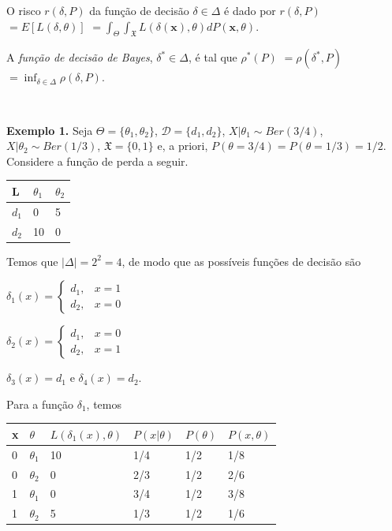 \documentclass[
]{book}
\begin{document}
O risco \(r(\delta,P)\) da função de decisão \(\delta \in \Delta\) é dado por \(r(\delta,P)\) \(=E\left[L\left(\delta,\theta\right)\right]\) \(=\displaystyle \int_\Theta \int_{\mathfrak{X}} L\left(\delta(\boldsymbol x),\theta\right) dP(\boldsymbol x,\theta)\).

A \emph{função de decisão de Bayes}, \({\delta}^* \in \Delta\), é tal que \({\rho}^*(P)\) \(=\rho({\delta}^*,P)\) \(=\displaystyle \inf_{\delta\in \Delta} \rho(\delta,P)\).

\(~\)

\textbf{Exemplo 1.} Seja \(\Theta=\{\theta_1,\theta_2\}\), \(\mathcal{D}=\{d_1,d_2\}\), \(X|\theta_1\sim Ber(3/4)\), \(X|\theta_2 \sim Ber(1/3)\), \(\mathfrak{X}=\{0,1\}\) e, a priori, \(P(\theta=3/4)=P(\theta=1/3)=1/2\). Considere a função de perda a seguir.

\begin{longtable}[]{@{}lll@{}}
\toprule
L & \(\theta_1\) & \(\theta_2\) \\
\midrule
\endhead
\(d_1\) & 0 & 5 \\
\(d_2\) & 10 & 0 \\
\bottomrule
\end{longtable}

Temos que \(|\Delta| = 2^2=4\), de modo que as possíveis funções de decisão são

\(\delta_1(x)=\left\{\begin{array}{lr} d_1, & x=1\\ d_2, &x=0\end{array}\right.\)

\(\delta_2(x)=\left\{\begin{array}{lr} d_1, & x=0\\ d_2, &x=1\end{array}\right.\)

\(\delta_3(x)=d_1\) e \(\delta_4(x)=d_2\).

Para a função \(\delta_1\), temos

\begin{longtable}[]{@{}llllll@{}}
\toprule
x & \(\theta\) & \(L(\delta_1(x),\theta)\) & \(P(x|\theta)\) & \(P(\theta)\) & \(P(x,\theta)\) \\
\midrule
\endhead
0 & \(\theta_1\) & 10 & 1/4 & 1/2 & 1/8 \\
0 & \(\theta_2\) & 0 & 2/3 & 1/2 & 2/6 \\
1 & \(\theta_1\) & 0 & 3/4 & 1/2 & 3/8 \\
1 & \(\theta_2\) & 5 & 1/3 & 1/2 & 1/6 \\
\bottomrule
\end{longtable}
\end{document}
